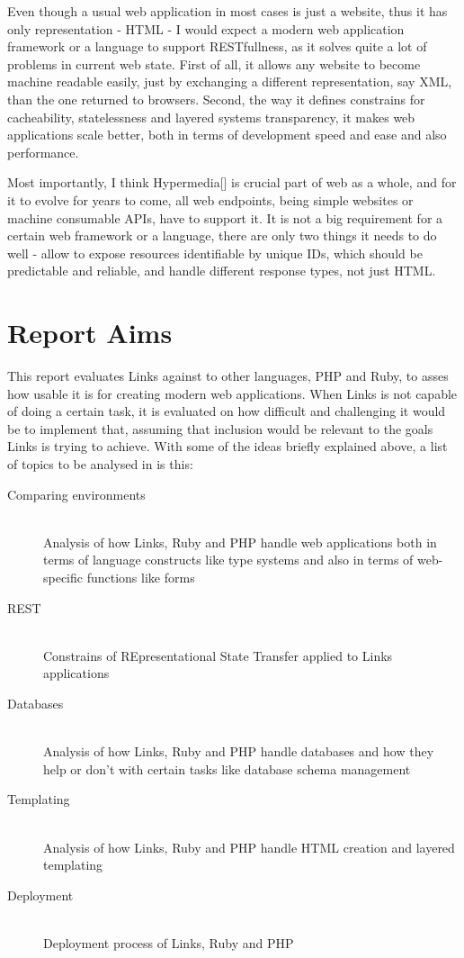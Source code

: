 Even though a usual web application in most cases is just a website, thus it has only representation - HTML - I would expect a modern web application framework or a language to support RESTfullness, as it solves quite a lot of problems in current web state. First of all, it allows any website to become machine readable easily, just by exchanging a different representation, say XML, than the one returned to browsers. Second, the way it defines constrains for cacheability, statelessness and layered systems transparency, it makes web applications scale better, both in terms of development speed and ease and also performance. 

Most importantly, I think Hypermedia[] is crucial part of web as a whole, and for it to evolve for years to come, all web endpoints, being simple websites or machine consumable APIs, have to support it. It is not a big requirement for a certain web framework or a language, there are only two things it needs to do well - allow to expose resources identifiable by unique IDs, which should be predictable and reliable, and handle different response types, not just HTML. 

\section{Report Aims}

This report evaluates Links against to other languages, PHP and Ruby, to asses how usable it is for creating modern web applications. When Links is not capable of doing a certain task, it is evaluated on how difficult and challenging it would be to implement that, assuming that inclusion would be relevant to the goals Links is trying to achieve. With some of the ideas briefly explained above, a list of topics to be analysed in is this:

\begin{description}
  \item[Comparing environments] \hfill \\
  Analysis of how Links, Ruby and PHP handle web applications both in terms of language constructs like type systems and also in terms of web-specific functions like forms
  \item[REST] \hfill \\
  Constrains of REpresentational State Transfer applied to Links applications
  \item[Databases] \hfill \\
  Analysis of how Links, Ruby and PHP handle databases and how they help or don't with certain tasks like database schema management
  \item[Templating] \hfill \\
  Analysis of how Links, Ruby and PHP handle HTML creation and layered templating
  \item[Deployment] \hfill \\
  Deployment process of Links, Ruby and PHP
\end{description}

